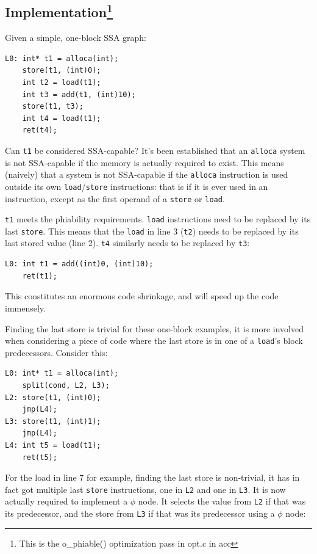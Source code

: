 \documentclass[12pt, a4paper]{article}
\begin{document}
\subsection[Implementation] {Implementation\footnote{This is the o\_phiable() optimization pass in opt.c in acc} }
Given a simple, one-block SSA graph:

\begin{lstlisting}
L0:	int* t1 = alloca(int);
	store(t1, (int)0);
	int t2 = load(t1);
	int t3 = add(t1, (int)10);
	store(t1, t3);
	int t4 = load(t1);
	ret(t4);
\end{lstlisting}

Can \verb+t1+ be considered SSA-capable? It's been established that an \verb+alloca+ system 
is not SSA-capable if the memory is actually required to exist. This means (naively) 
that a system is not SSA-capable if the \verb+alloca+ instruction is used outside 
its own \verb+load+/\verb+store+ instructions: that is if it is ever used in an 
instruction, except as the first operand of a \verb+store+ or \verb+load+.

\verb+t1+ meets the phiability requirements. \verb+load+ instructions need to be 
replaced by its last \verb+store+. This means that the \verb+load+ in line 3 
(\verb+t2+) needs to be replaced by its last stored value (line 2). \verb+t4+ 
similarly needs to be replaced by \verb+t3+:

\begin{lstlisting}
L0:	int t1 = add((int)0, (int)10);
	ret(t1);
\end{lstlisting}

This constitutes an enormous code shrinkage, and will speed up the code 
immensely.

Finding the last store is trivial for these one-block examples, it is more 
involved when considering a piece of code where the last store is in one of a 
\verb+load+'s block predecessors. Consider this:

\begin{lstlisting}
L0:	int* t1 = alloca(int);
	split(cond, L2, L3);
L2:	store(t1, (int)0);
	jmp(L4);
L3:	store(t1, (int)1);
	jmp(L4);
L4:	int t5 = load(t1);
	ret(t5);
\end{lstlisting}

For the load in line 7 for example, finding the last store is non-trivial, it 
has in fact got multiple last \verb+store+ instructions, one in \verb+L2+ and one in 
\verb+L3+. It is now actually required to implement a  $\phi$ node. It selects 
the value from \verb+L2+ if that was its predecessor, and the store from \verb+L3+ if 
that was its predecessor using a $\phi$ node:
\end{document}
